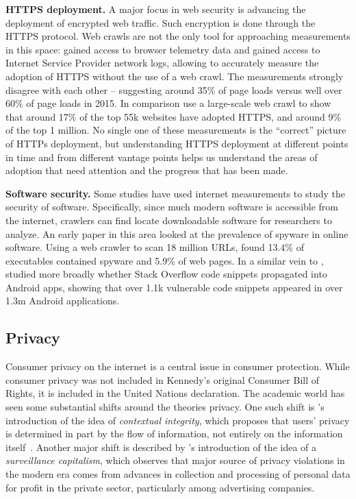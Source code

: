 \textbf{HTTPS deployment.}
A major focus in web security is advancing the deployment of encrypted web traffic. Such encryption is done through the HTTPS protocol. Web crawls are not the only tool for approaching measurements in this space: \citet{felt2017measuring} gained access to browser telemetry data and \citet{chan2018monitoring} gained access to Internet Service Provider network logs, allowing to accurately measure the adoption of HTTPS without the use of a web crawl. The measurements strongly disagree with each other -- suggesting around 35\% of page loads versus well over 60\% of page loads in 2015. In comparison \citet{englehardt2015cookies} use a large-scale web crawl to show that around 17\% of the top 55k websites have adopted HTTPS, and around 9\% of the top 1 million. No single one of these measurements is the ``correct'' picture of HTTPs deployment, but understanding HTTPS deployment at different points in time and from different vantage points helps us understand the areas of adoption that need attention and the progress that has been made.

\textbf{Software security.}
Some studies have used internet measurements to study the security of software. Specifically, since much modern software is accessible from the internet, crawlers can find locate downloadable software for researchers to analyze. An early paper in this area looked at the prevalence of spyware in online software. Using a web crawler to scan 18 million URLs, \citet{moshchuk2006crawler} found 13.4\% of executables contained spyware and 5.9\% of web pages. In a similar vein to \cite{kharche2021study}, \cite{fischer2017stack} studied more broadly whether Stack Overflow code snippets propagated into Android apps, showing that over 1.1k vulnerable code snippets appeared in over 1.3m Android applications. 


\subsection{Privacy}
Consumer privacy on the internet is a central issue in consumer protection. While consumer privacy was not included in Kennedy's original Consumer Bill of Rights, it is included in the United Nations declaration. The academic world has seen some substantial shifts around the theories privacy. One such shift is \citet{nissenbaum2004privacy}'s introduction of the idea of \textit{contextual integrity}, which proposes that users' privacy is determined in part by the flow of information, not entirely on the information itself~\cite{nissenbaum2009privacy}. Another major shift is described by \citet{zuboff2014digital}'s introduction of the idea of a \textit{surveillance capitalism}, which observes that major source of privacy violations in the modern era comes from advances in collection and processing of personal data for profit in the private sector, particularly among advertising companies.

